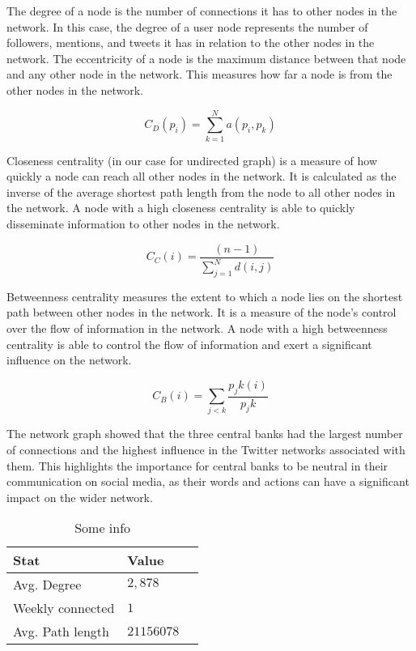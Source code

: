 \documentclass[fleqn,10pt]{SelfArx} %
\begin{document}
The degree of a node is the number of connections it has to other nodes in the network. In this case, the degree of a user node represents the number of followers, mentions, and tweets it has in relation to the other nodes in the network. The eccentricity of a node is the maximum distance between that node and any other node in the network. This measures how far a node is from the other nodes in the network.

\begin{equation}
	C_D(p_i)=\displaystyle \sum_{k=1}^N a(p_i,p_k) 
	\label{eq:refname2}
\end{equation}


Closeness centrality (in our case for undirected graph) is a measure of how quickly a node can reach all other nodes in the network. It is calculated as the inverse of the average shortest path length from the node to all other nodes in the network. A node with a high closeness centrality is able to quickly disseminate information to other nodes in the network.

\begin{equation}
	C_C(i)=\frac{(n-1)}{\displaystyle \sum_{j=1}^N d(i,j)}
	\label{eq:refname2}
\end{equation}


Betweenness centrality measures the extent to which a node lies on the shortest path between other nodes in the network. It is a measure of the node's control over the flow of information in the network. A node with a high betweenness centrality is able to control the flow of information and exert a significant influence on the network.

\begin{equation}
	C_B(i)=\displaystyle \sum_{j<k}\frac{p_jk(i)}{p_jk}
	\label{eq:refname2}
\end{equation}


The network graph showed that the three central banks had the largest number of connections and the highest influence in the Twitter networks associated with them. This highlights the importance for central banks to be neutral in their communication on social media, as their words and actions can have a significant impact on the wider network. 


\begin{table}[hbt]
	\caption{Some info}
	\centering
	\begin{tabular}{llr}
		\toprule
		\cmidrule(r){1-2}
		Stat & Value \\
		\midrule
		Avg. Degree & $2,878$ \\
		Weekly connected  & $1$ \\
		Avg. Path length  & $21156078$ \\
		\bottomrule
	\end{tabular}
	\label{tab:label}
\end{table}
\end{document}
